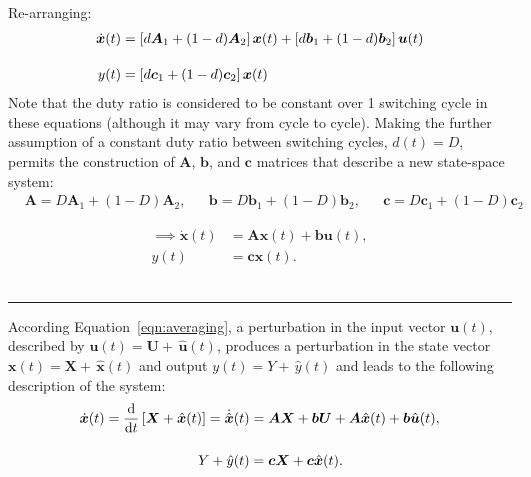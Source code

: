 Re-arranging:
\begin{align*}
\dot{\boldsymbol{x}}(t)
&= \left[d \boldsymbol{A}_1 + (1 - d) \boldsymbol{A}_2\right]\boldsymbol{x}(t)
+ \left[d \boldsymbol{b}_1 + (1 - d) \boldsymbol{b}_2\right]\boldsymbol{u}(t)
\\[11pt]
y(t) &= \left[d\boldsymbol{c}_1 + (1 - d) \boldsymbol{c}_2\right] \boldsymbol{x}(t)
\end{align*}
Note that the duty ratio is considered to be constant over 1 switching cycle in these equations (although it may vary from cycle to cycle).
\clearpage
Making the further assumption of a constant duty ratio between switching cycles, $d(t) = D$, permits the construction of $\boldsymbol{A}$, $\boldsymbol{b}$, and $\boldsymbol{c}$ matrices that describe a new state-space system:
\begin{align}
&
\boldsymbol{A} = D \boldsymbol{A}_1 + (1 - D) \boldsymbol{A}_2,
&&
\boldsymbol{b} = D \boldsymbol{b}_1 + (1 - D) \boldsymbol{b}_2,
&&
\boldsymbol{c} = D \boldsymbol{c}_1 + (1 - D) \boldsymbol{c}_2
\label{eqn:matrices_steadystate}
\end{align}
\begin{comment}
\begin{itemize}
\item $\boldsymbol{A} = D \boldsymbol{A}_1 + (1 - D) \boldsymbol{A}_2$
\item $\boldsymbol{b} = D \boldsymbol{b}_1 + (1 - D) \boldsymbol{b}_2$
\item $\boldsymbol{c} = D \boldsymbol{c}_1 + (1 - D) \boldsymbol{c}_2$
\end{itemize}
\end{comment}
\begin{align}
\implies
\dot{\boldsymbol{x}}(t)
&= \boldsymbol{A} \boldsymbol{x}(t) + \boldsymbol{b} \boldsymbol{u}(t), \nonumber
\\[11pt]
y(t) &= \boldsymbol{c} \boldsymbol{x}(t). \label{eqn:averaging}
\end{align}
~\rule{\textwidth}{0.5pt}
According Equation~\ref{eqn:averaging}, a perturbation in the input vector $\boldsymbol{u}(t)$, described by $\boldsymbol{u}(t) = \boldsymbol{U} + \, \hat{\boldsymbol{u}}(t)$, produces a perturbation in the state vector $\boldsymbol{x}(t) = \boldsymbol{X} + \, \hat{\boldsymbol{x}}(t)$ and output $y(t) = Y + \, \hat{y}(t)$ and leads to the following description of the system:
\begin{align}
\dot{\boldsymbol{x}}(t) = \frac{\mathrm{d}}{\mathrm{d} t} \left[\boldsymbol{X} + \hat{\boldsymbol{x}}(t)\right] = \dot{\hat{\boldsymbol{x}}}(t)
&=
\boldsymbol{A} \boldsymbol{X} + \boldsymbol{b} \boldsymbol{U} + \boldsymbol{A} \hat{\boldsymbol{x}}(t) + \boldsymbol{b} \hat{\boldsymbol{u}}(t),\nonumber
\\[11pt]
Y + \hat{y}(t) &= \boldsymbol{c} \boldsymbol{X} + \boldsymbol{c}
\hat{\boldsymbol{x}}(t).\label{eqn:inputperturb}
\end{align}
